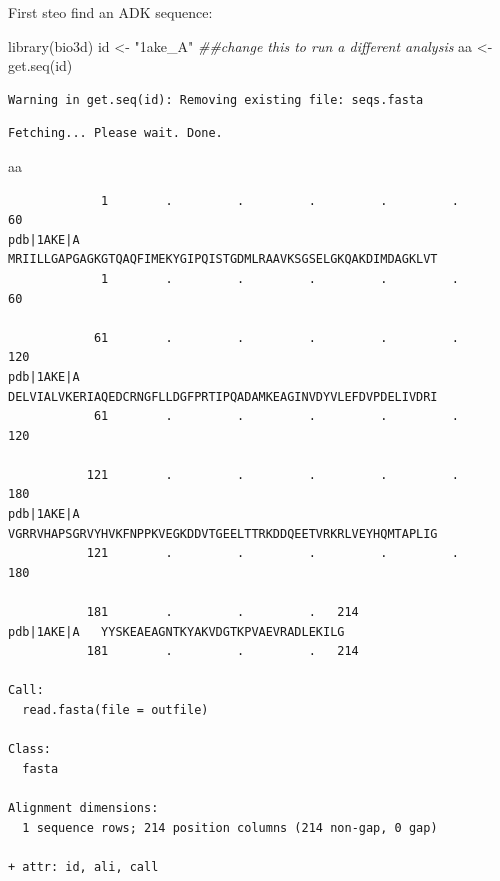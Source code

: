 \documentclass[
  letterpaper,
  DIV=11,
  numbers=noendperiod]{scrartcl}
\newenvironment{Shaded}{\begin{snugshade}}{\end{snugshade}}
\newcommand{\DocumentationTok}[1]{\textcolor[rgb]{0.37,0.37,0.37}{\textit{#1}}}
\newcommand{\FunctionTok}[1]{\textcolor[rgb]{0.28,0.35,0.67}{#1}}
\newcommand{\NormalTok}[1]{\textcolor[rgb]{0.00,0.23,0.31}{#1}}
\newcommand{\OtherTok}[1]{\textcolor[rgb]{0.00,0.23,0.31}{#1}}
\newcommand{\StringTok}[1]{\textcolor[rgb]{0.13,0.47,0.30}{#1}}
\begin{document}
First steo find an ADK sequence:

\begin{Shaded}
\begin{Highlighting}[]
\FunctionTok{library}\NormalTok{(bio3d)}
\NormalTok{id }\OtherTok{\textless{}{-}} \StringTok{"1ake\_A"} \DocumentationTok{\#\#change this to run a different analysis }
\NormalTok{aa }\OtherTok{\textless{}{-}}\FunctionTok{get.seq}\NormalTok{(id)}
\end{Highlighting}
\end{Shaded}

\begin{verbatim}
Warning in get.seq(id): Removing existing file: seqs.fasta
\end{verbatim}

\begin{verbatim}
Fetching... Please wait. Done.
\end{verbatim}

\begin{Shaded}
\begin{Highlighting}[]
\NormalTok{aa}
\end{Highlighting}
\end{Shaded}

\begin{verbatim}
             1        .         .         .         .         .         60 
pdb|1AKE|A   MRIILLGAPGAGKGTQAQFIMEKYGIPQISTGDMLRAAVKSGSELGKQAKDIMDAGKLVT
             1        .         .         .         .         .         60 

            61        .         .         .         .         .         120 
pdb|1AKE|A   DELVIALVKERIAQEDCRNGFLLDGFPRTIPQADAMKEAGINVDYVLEFDVPDELIVDRI
            61        .         .         .         .         .         120 

           121        .         .         .         .         .         180 
pdb|1AKE|A   VGRRVHAPSGRVYHVKFNPPKVEGKDDVTGEELTTRKDDQEETVRKRLVEYHQMTAPLIG
           121        .         .         .         .         .         180 

           181        .         .         .   214 
pdb|1AKE|A   YYSKEAEAGNTKYAKVDGTKPVAEVRADLEKILG
           181        .         .         .   214 

Call:
  read.fasta(file = outfile)

Class:
  fasta

Alignment dimensions:
  1 sequence rows; 214 position columns (214 non-gap, 0 gap) 

+ attr: id, ali, call
\end{verbatim}
\end{document}
